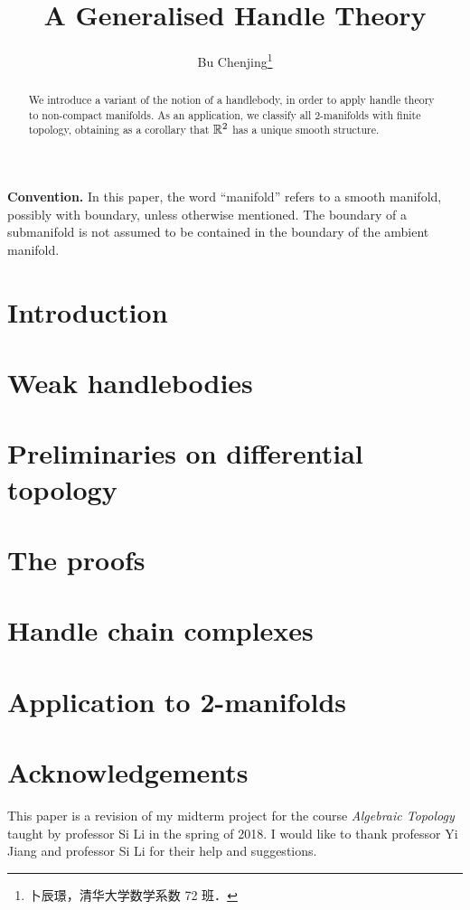 \documentclass[twoside]{article}
\begin{document}
\title{A Generalised Handle Theory}
\author{Bu Chenjing\footnote{卜辰璟，清华大学数学系数 72 班．}}

\begin{abstract}
    We introduce a variant of the notion of a handlebody,
    in order to apply handle theory to non-compact manifolds.
    As an application, we classify all $2$-manifolds
    with finite topology, obtaining as a corollary that
    $\mathbb{R}^2$ has a unique smooth structure.
\end{abstract}

\noindent\textbf{Convention.}
In this paper, the word ``manifold''
refers to a smooth manifold, possibly with boundary,
unless otherwise mentioned.
The boundary of a submanifold is not assumed
to be contained in the boundary of the ambient manifold.

\section{Introduction}



\section{Weak handlebodies}



\section{Preliminaries on differential topology}



\section{The proofs}



\section{Handle chain complexes}



\section{Application to 2-manifolds}



\section*{Acknowledgements}

This paper is a revision of my midterm project
for the course \emph{Algebraic Topology}
taught by professor Si Li in the spring of 2018.
I would like to thank professor Yi Jiang and professor Si Li 
for their help and suggestions.

\printbibliography
\end{document}
